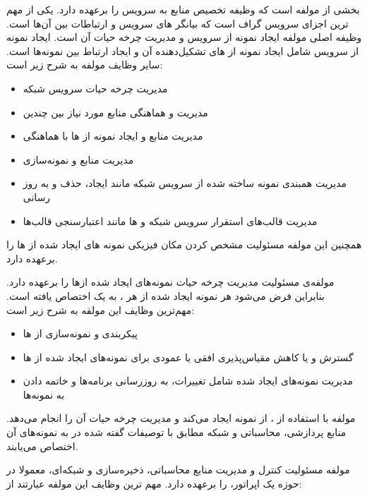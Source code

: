  بخشی از مولفه  است که وظیفه تخصیص منابع به سرویس را برعهده دارد.
یکی از مهم ترین اجزای سرویس گراف  است که بیانگر  های سرویس و ارتباطات بین آن‌ها است.
وظیفه اصلی مولفه  ایجاد نمونه از سرویس و مدیریت چرخه حیات آن است.
ایجاد نمونه از سرویس شامل ایجاد نمونه از ‌های تشکیل‌دهنده آن و ایجاد ارتباط بین نمونه‌ها است.
سایر وظایف مولفه  به شرح زیر است:
\begin{itemize}
    \item مدیریت چرخه حیات سرویس شبکه
    \item مدیریت و هماهنگی منابع مورد نیاز  بین چندین 
    \item مدیریت منابع و ایجاد نمونه از ‌ها با هماهنگی 
    \item مدیریت منابع و نمونه‌سازی 
    \item مدیریت همبندی نمونه ساخته شده از سرویس شبکه مانند ایجاد، حذف و به روز رسانی 
    \item مدیریت قالب‌های استقرار سرویس شبکه و ها مانند اعتبارسنجی قالب‌ها
\end{itemize}
همچنین این مولفه مسئولیت مشخص کردن مکان فیزیکی نمونه های ایجاد شده از ها را برعهده دارد.

مولفه‌ی  مسئولیت مدیریت چرخه حیات نمونه‌های ایجاد شده از‌ها را برعهده دارد.
بنابراین فرض می‌شود هر نمونه ایجاد شده از هر ، به یک  اختصاص یافته است.
مهم‌ترین وظایف این مولفه به شرح زیر است:
\begin{itemize}
    \item پیکربندی و نمونه‌سازی از ‌ها
    \item گسترش و یا کاهش مقیاس‌پذیری افقی یا عمودی برای نمونه‌های ایجاد شده از ها
    \item مدیریت نمونه‌های ایجاد شده شامل  تغییرات، به روزرسانی برنامه‌ها و خاتمه دادن به نمونه‌ها
\end{itemize}
مولفه  با استفاده از ، از  نمونه ایجاد می‌کند و
مدیریت چرخه حیات آن را انجام می‌دهد.
منابع پردازشی، محاسباتی و شبکه مطابق با توصیفات گفته شده در  به نمونه‌های آن اختصاص می‌یابند.

مولفه  مسئولیت کنترل و مدیریت منابع محاسباتی، ذخیره‌سازی و شبکه‌ای،
معمولا در حوزه یک اپراتور، را برعهده دارد.
مهم ترین وظایف این مولفه عبارتند از:

